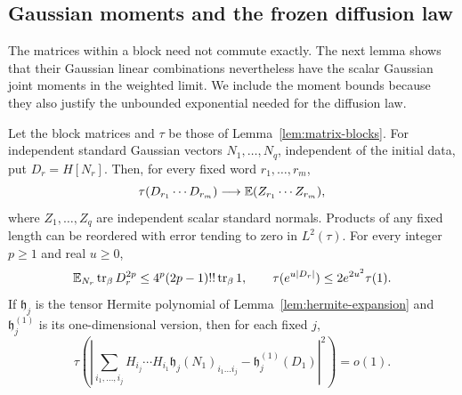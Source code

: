 \subsection{Gaussian moments and the frozen diffusion law}

The matrices within a block need not commute exactly.  The next lemma
shows that their Gaussian linear combinations nevertheless have the
scalar Gaussian joint moments in the weighted limit.  We include the
moment bounds because they also justify the unbounded exponential needed
for the diffusion law.

\begin{lemma}\label{lem:matrix-gaussian-moments}
Let the block matrices and $\tau$ be those of
Lemma~\ref{lem:matrix-blocks}.  For independent standard Gaussian vectors
$N_1,\ldots,N_q$, independent of the initial data, put $D_r=H[N_r]$.
Then, for every fixed word $r_1,\ldots,r_m$,
\begin{equation}\label{eq:matrix-gaussian-joint-law}
 \tau(D_{r_1}\cdots D_{r_m})
 \longrightarrow \mathbb E(Z_{r_1}\cdots Z_{r_m}),
\end{equation}
where $Z_1,\ldots,Z_q$ are independent scalar standard normals.
Products of any fixed length can be reordered with error tending to zero
in $L^2(\tau)$.  For every integer $p\ge1$ and real $u\ge0$,
\begin{equation}\label{eq:matrix-gaussian-moment-bound}
 \mathbb E_{N_r}\operatorname{tr}_\beta D_r^{2p}
 \le4^p(2p-1)!!\operatorname{tr}_\beta1,
 \qquad
 \tau(e^{u|D_r|})\le2e^{2u^2}\tau(1).
\end{equation}
If $\mathfrak h_j$ is the tensor Hermite polynomial of
Lemma~\ref{lem:hermite-expansion} and $\mathfrak h_j^{(1)}$ is its
one-dimensional version, then for each fixed $j$,
\begin{equation}\label{eq:matrix-wick-reduction}
 \tau\left(\left|
 \sum_{i_1,\ldots,i_j}H_{i_j}\cdots H_{i_1}
      \mathfrak h_j(N_1)_{i_1\ldots i_j}
 -\mathfrak h_j^{(1)}(D_1)\right|^2\right)=o(1).
\end{equation}
\end{lemma}
